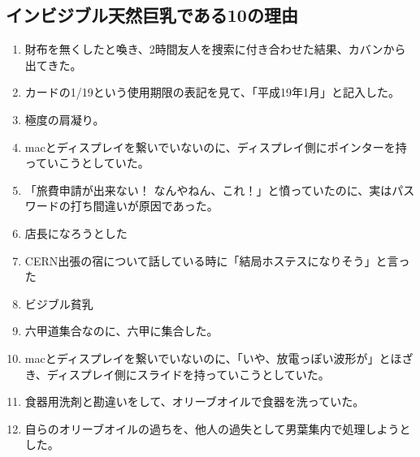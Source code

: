 \documentclass[12pt]{jsarticle}
\begin{document}
\subsection{インビジブル天然巨乳である10の理由}
\begin{enumerate}
\item 財布を無くしたと喚き、2時間友人を捜索に付き合わせた結果、カバンから出てきた。
\item カードの1/19という使用期限の表記を見て、「平成19年1月」と記入した。
\item 極度の肩凝り。
\item macとディスプレイを繋いでいないのに、ディスプレイ側にポインターを持っていこうとしていた。
\item「旅費申請が出来ない！ なんやねん、これ！」と憤っていたのに、実はパスワードの打ち間違いが原因であった。
\item 店長になろうとした
\item CERN出張の宿について話している時に「結局ホステスになりそう」と言った
\item ビジブル貧乳
\item 六甲道集合なのに、六甲に集合した。
\item macとディスプレイを繋いでいないのに、「いや、放電っぽい波形が」とほざき、ディスプレイ側にスライドを持っていこうとしていた。
\item 食器用洗剤と勘違いをして、オリーブオイルで食器を洗っていた。
\item 自らのオリーブオイルの過ちを、他人の過失として男葉集内で処理しようとした。
\end{enumerate}

\newpage
\end{document}
